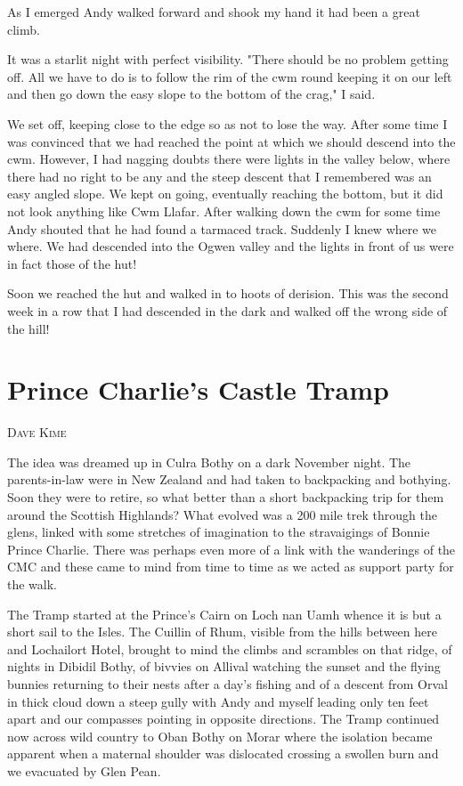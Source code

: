 \documentclass[a5paper,openany,font 10pt]{scrbook}
\makeatletter
\newcommand{\chapterauthor}[1]{%
{\parindent0pt\vspace*{-5pt}%
\linespread{1.1}\large\scshape#1%
\par\nobreak\vspace*{35pt}}
\@afterheading%
}
\makeatother
\begin{document}
As I emerged Andy walked forward and shook my hand  it had
been a great climb.

It was a starlit night with perfect visibility.
	"There should be no problem getting off. All we have to do
is to follow the rim of the cwm round keeping it on our left and
then go down the easy slope to the bottom of the crag," I said.

We set off, keeping close to the edge so as not to lose the
way. After some time I was convinced that we had reached the
point at which we should descend into the cwm. However, I had
nagging doubts   there were lights in the valley below, where
there had no right to be any and the steep descent that I
remembered was an easy angled slope. We kept on going, eventually
reaching the bottom, but it did not look anything like Cwm
Llafar. After walking down the cwm for some time Andy shouted
that he had found a tarmaced track. Suddenly I knew where we
where. We had descended into the Ogwen valley and the lights in
front of us were in fact those of the hut!

Soon we reached the hut and walked in to hoots of derision.
This was the second week in a row that I had descended in the
dark and walked off the wrong side of the hill!

\chapter{Prince Charlie's Castle Tramp}
\label{sec:org46df898}
\chapterauthor{Dave Kime}

The idea was dreamed up in Culra Bothy on a dark November
night. The parents-in-law were in New Zealand and had taken to
backpacking and bothying. Soon they were to retire, so what
better than a short backpacking trip for them around the Scottish
Highlands? What evolved was a 200 mile trek through the glens,
linked with some stretches of imagination to the stravaigings of
Bonnie Prince Charlie. There was perhaps even more of a link with
the wanderings of the CMC and these came to mind from time to
time as we acted as support party for the walk.

The Tramp started at the Prince's Cairn on Loch nan Uamh
whence it is but a short sail to the Isles. The Cuillin of Rhum,
visible from the hills between here and Lochailort Hotel, brought
to mind the climbs and scrambles on that ridge, of nights in
Dibidil Bothy, of bivvies on Allival watching the sunset and the
flying bunnies returning to their nests after a day's fishing
and of a descent from Orval in thick cloud down a steep gully
with Andy and myself leading only ten feet apart and our
compasses pointing in opposite directions. The Tramp continued
now across wild country to Oban Bothy on Morar where the
isolation became apparent when a maternal shoulder was dislocated
crossing a swollen burn and we evacuated by Glen Pean.
\end{document}
